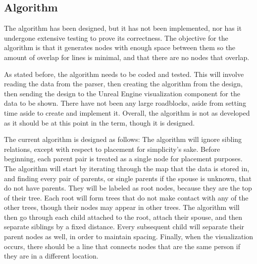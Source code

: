 \documentclass[onecolumn, draftclsnofoot, 10pt, compsoc]{IEEEtran}
\begin{document}
\subsection{Algorithm}
\begin{singlespace}
The algorithm has been designed, but it has not been implemented, nor has it undergone extensive testing to prove its correctness. The objective for the algorithm is that it generates nodes with enough space between them so the amount of overlap for lines is minimal, and that there are no nodes that overlap. 

As stated before, the algorithm needs to be coded and tested. This will involve reading the data from the parser, then creating the algorithm from the design, then sending the design to the Unreal Engine visualization component for the data to be shown. There have not been any large roadblocks, aside from setting time aside to create and implement it. Overall, the algorithm is not as developed as it should be at this point in the term, though it is designed.

The current algorithm is designed as follows: The algorithm will ignore sibling relations, except with respect to placement for simplicity's sake. Before beginning, each parent pair is treated as a single node for placement purposes. The algorithm will start by iterating through the map that the data is stored in, and finding every pair of parents, or single parents if the spouse is unknown, that do not have parents. They will be labeled as root nodes, because they are the top of their tree. Each root will form trees that do not make contact with any of the other trees, though their nodes may appear in other trees. The algorithm will then go through each child attached to the root, attach their spouse, and then separate siblings by a fixed distance. Every subsequent child will separate their parent nodes as well, in order to maintain spacing. Finally, when the visualization occurs, there should be a line that connects nodes that are the same person if they are in a different location.
\end{singlespace}
\end{document}
